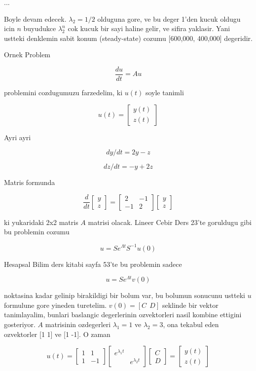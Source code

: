 \documentclass[12pt,fleqn]{article}\usepackage{../common}
\begin{document}
...

Boyle devam edecek. $\lambda_2=1/2$ olduguna gore, ve bu deger 1'den kucuk
oldugu icin $n$ buyudukce $\lambda_2^n$ cok kucuk bir sayi haline gelir, ve
sifira yaklasir. Yani ustteki denklemin sabit konum (steady-state)
cozumu [600,000, 400,000] degeridir.

Ornek Problem

\[ 
\frac{du}{dt} = Au
 \]

problemini cozdugumuzu farzedelim, ki $u(t)$ soyle tanimli

\[ 
u(t) =
\left[\begin{array}{r}
y(t) \\
z(t)
\end{array}\right]
 \]

Ayri ayri

\[ dy/dt = 2y - z \]

\[ dz/dt = -y + 2z \]

Matris formunda

\[ 
\frac{d}{dt}
\left[\begin{array}{r}
y \\
z
\end{array}\right]=
\left[\begin{array}{rr}
2 & -1 \\
-1 & 2
\end{array}\right]
\left[\begin{array}{r}
y \\
z
\end{array}\right]
 \]

ki yukaridaki 2x2 matris $A$ matrisi olacak. Lineer Cebir Ders 23'te
goruldugu gibi bu problemin cozumu 

\[ u = S e^{\Lambda t} S^{-1} u(0) \]

Hesapsal Bilim ders kitabi sayfa 53'te bu problemin sadece 

\[ u = S e^{\Lambda t} v(0) \]

noktasina kadar gelinip birakildigi bir bolum var, bu bolumun sonucunu
ustteki $u$ formulune gore yineden turetelim. $v(0) = [C \ \ D]$ seklinde
bir vektor tanimlayalim, bunlari baslangic degerlerinin ozvektorleri nasil
kombine ettigini gosteriyor. $A$ matrisinin ozdegerleri $\lambda_1=1$ ve
$\lambda_2=3$, ona tekabul eden ozvektorler [1 1] ve [1 -1]. O zaman

\[ 
u(t) =
\left[\begin{array}{rr}
1 & 1 \\
1 & -1
\end{array}\right]
\left[\begin{array}{rr}
e^{\lambda_1 t} & \\
& e^{\lambda_2 t} 
\end{array}\right]
\left[\begin{array}{r}
C \\
D
\end{array}\right]
= 
\left[\begin{array}{r}
y(t) \\
z(t)
\end{array}\right]
 \]
\end{document}
